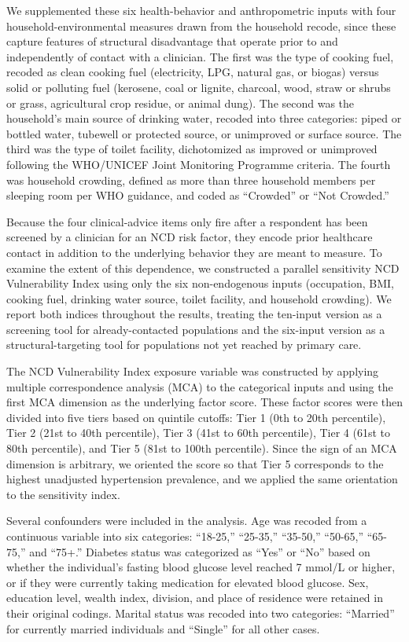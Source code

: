 \documentclass[
  12pt,
  a4paper]{article}
\begin{document}
We supplemented these six health-behavior and anthropometric inputs with four household-environmental measures drawn from the household recode, since these capture features of structural disadvantage that operate prior to and independently of contact with a clinician. The first was the type of cooking fuel, recoded as clean cooking fuel (electricity, LPG, natural gas, or biogas) versus solid or polluting fuel (kerosene, coal or lignite, charcoal, wood, straw or shrubs or grass, agricultural crop residue, or animal dung). The second was the household's main source of drinking water, recoded into three categories: piped or bottled water, tubewell or protected source, or unimproved or surface source. The third was the type of toilet facility, dichotomized as improved or unimproved following the WHO/UNICEF Joint Monitoring Programme criteria. The fourth was household crowding, defined as more than three household members per sleeping room per WHO guidance, and coded as ``Crowded'' or ``Not Crowded.''

Because the four clinical-advice items only fire after a respondent has been screened by a clinician for an NCD risk factor, they encode prior healthcare contact in addition to the underlying behavior they are meant to measure. To examine the extent of this dependence, we constructed a parallel sensitivity NCD Vulnerability Index using only the six non-endogenous inputs (occupation, BMI, cooking fuel, drinking water source, toilet facility, and household crowding). We report both indices throughout the results, treating the ten-input version as a screening tool for already-contacted populations and the six-input version as a structural-targeting tool for populations not yet reached by primary care.

The NCD Vulnerability Index exposure variable was constructed by applying multiple correspondence analysis (MCA) to the categorical inputs and using the first MCA dimension as the underlying factor score. These factor scores were then divided into five tiers based on quintile cutoffs: Tier 1 (0th to 20th percentile), Tier 2 (21st to 40th percentile), Tier 3 (41st to 60th percentile), Tier 4 (61st to 80th percentile), and Tier 5 (81st to 100th percentile). Since the sign of an MCA dimension is arbitrary, we oriented the score so that Tier 5 corresponds to the highest unadjusted hypertension prevalence, and we applied the same orientation to the sensitivity index.

Several confounders were included in the analysis. Age was recoded from a continuous variable into six categories: ``18-25,'' ``25-35,'' ``35-50,'' ``50-65,'' ``65-75,'' and ``75+.'' Diabetes status was categorized as ``Yes'' or ``No'' based on whether the individual's fasting blood glucose level reached 7 mmol/L or higher, or if they were currently taking medication for elevated blood glucose. Sex, education level, wealth index, division, and place of residence were retained in their original codings. Marital status was recoded into two categories: ``Married'' for currently married individuals and ``Single'' for all other cases.
\end{document}

